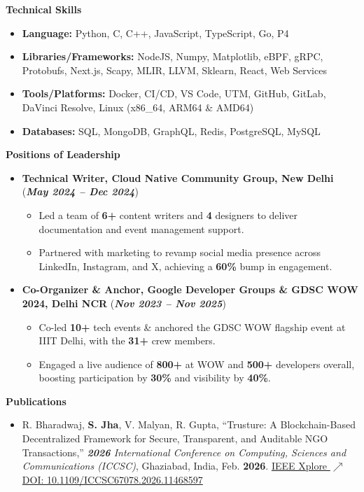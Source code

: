 \documentclass[9pt]{extarticle}
\newcommand{\sectionhead}[1]{%
  \par\vspace{7.5pt}%
  \noindent\begin{tcolorbox}\textbf{\fontsize{10}{10.5}\selectfont #1}\end{tcolorbox}%
}
\begin{document}
\sectionhead{Technical Skills}%
\noindent\begin{itemize}[topsep=0pt, itemsep=0pt]
\item \textbf{Language:} Python, C, C++, JavaScript, TypeScript, Go, P4
\item \textbf{Libraries/Frameworks:} NodeJS, Numpy, Matplotlib, eBPF, gRPC, Protobufs, Next.js, Scapy, MLIR, LLVM, Sklearn, React, Web Services
\item \textbf{Tools/Platforms:} Docker, CI/CD, VS Code, UTM, GitHub, GitLab, DaVinci Resolve, Linux (x86\_64, ARM64 \& AMD64)
\item \textbf{Databases:} SQL, MongoDB, GraphQL, Redis, PostgreSQL, MySQL
\end{itemize}%
\sectionhead{Positions of Leadership}%
\noindent\begin{itemize}[leftmargin=14pt, topsep=0pt]
  \item \textbf{Technical Writer, Cloud Native Community Group, New Delhi} \hfill (\textit{\textbf{May 2024 -- Dec 2024}})
  \begin{itemize}[leftmargin=10pt, label={--}]
    \item Led a team of \textbf{6+} content writers and \textbf{4} designers to deliver documentation and event management support.
    \item Partnered with marketing to revamp social media presence across LinkedIn, Instagram, and X, achieving a \textbf{60\%} bump in engagement.
  \end{itemize}
  \item \textbf{Co-Organizer \& Anchor, Google Developer Groups \& GDSC WOW \textbf{2024}, Delhi NCR} \hfill (\textit{\textbf{Nov 2023 -- Nov 2025}})
  \begin{itemize}[leftmargin=10pt, label={--}]
    \item Co-led \textbf{10+} tech events \& anchored the GDSC WOW flagship event at IIIT Delhi, with the \textbf{31+} crew members.
    \item Engaged a live audience of \textbf{800+} at WOW and \textbf{500+} developers overall, boosting participation by \textbf{30\%} and visibility by \textbf{40\%}.
  \end{itemize}
\end{itemize}%
\sectionhead{Publications}%
\noindent\begin{itemize}[topsep=0pt, itemsep=0pt]
\item R. Bharadwaj, \textbf{S. Jha}, V. Malyan, R. Gupta, ``Trusture: A Blockchain-Based Decentralized Framework for Secure, Transparent, and Auditable NGO Transactions,'' \textit{\textbf{2026} International Conference on Computing, Sciences and Communications (ICCSC)}, Ghaziabad, India, Feb. \textbf{2026}. \href{https://ieeexplore.ieee.org/abstract/document/11468597/}{IEEE Xplore $\nearrow$} \hfill \href{https://doi.org/10.1109/ICCSC67078.2026.11468597}{DOI: 10.1109/ICCSC67078.2026.11468597}
\end{itemize}%
\end{document}
